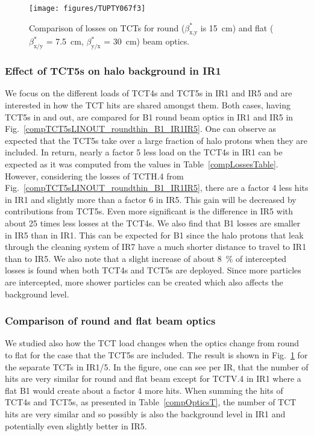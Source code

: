 \begin{figure}[tbh]
    \centering
    \texttt{[image: figures/TUPTY067f3]}
    \vspace{-0.5cm}
    \caption{Comparison of losses on TCTs for round ($\beta^*_{\textrm{x,y}}$ is 15~cm) and flat ($\beta^*_{\textrm{x/y}}$ = 7.5~cm, $\beta^*_{\textrm{y/x}}$ = 30~cm) beam optics.}
    \label{compOptics}
\end{figure}

\subsubsection{Effect of TCT5s on halo background in IR1}
We focus on the different loads of TCT4s and TCT5s in IR1 and IR5 and are interested in how the TCT hits are shared amongst them. Both cases, having TCT5s in and out, are compared for B1 round beam optics in IR1 and IR5 in Fig.~\ref{compTCT5sLINOUT_roundthin_B1_IR1IR5}. One can observe as expected that the TCT5s take over a large fraction of halo protons when they are included. In return, nearly a factor 5 less load on the TCT4s in IR1 can be expected as it was computed from the values in Table~\ref{compLossesTable}. However, considering the losses of TCTH.4 from Fig.~\ref{compTCT5sLINOUT_roundthin_B1_IR1IR5}, there are a factor 4 less hits in IR1 and slightly more than a factor 6 in IR5. This gain will be decreased by contributions from TCT5s. Even more significant is the difference in IR5 with about 25 times less losses at the TCT4s. We also find that B1 losses are smaller in IR5 than in IR1. This can be expected for B1 since the halo protons that leak through the cleaning system of IR7 have a much shorter distance to travel to IR1 than to IR5. We also note that a slight increase of about 8~\% of intercepted losses is found when both TCT4s and TCT5s are deployed. Since more particles are intercepted, more shower particles can be created which also affects the background level. %

\subsubsection{Comparison of round and flat beam optics}

We studied also how the TCT load changes when the optics change from round to flat for the case that the TCT5s are included. The result is shown in Fig.~\ref{compOptics} for the separate TCTs in IR1/5. In the figure, one can see per IR, that the number of hits are very similar for round and flat beam except for TCTV.4 in IR1 where a flat B1 would create about a factor 4 more hits. When summing the hits of TCT4s and TCT5s, as presented in Table~\ref{compOpticsT}, the number of TCT hits are very similar and so possibly is also the background level in IR1 and potentially even slightly better in IR5.

